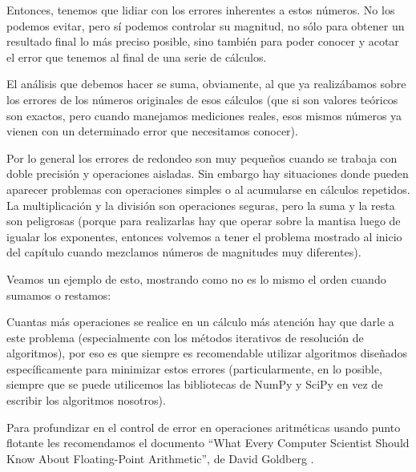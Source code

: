 Entonces, tenemos que lidiar con los errores inherentes a estos números. No los podemos evitar, pero sí podemos controlar su magnitud, no sólo para obtener un resultado final lo más preciso posible, sino también para poder conocer y acotar el error que tenemos al final de una serie de cálculos.

El análisis que debemos hacer se suma, obviamente, al que ya realizábamos sobre los errores de los números originales de esos cálculos (que si son valores teóricos son exactos, pero cuando manejamos mediciones reales, esos mismos números ya vienen con un determinado error que necesitamos conocer).

Por lo general los errores de redondeo son muy pequeños cuando se trabaja con doble precisión y operaciones aisladas. Sin embargo hay situaciones donde pueden aparecer problemas con operaciones simples o al acumularse en cálculos repetidos. La multiplicación y la división son operaciones seguras, pero la suma y la resta son peligrosas (porque para realizarlas hay que operar sobre la mantisa luego de igualar los exponentes, entonces volvemos a tener el problema mostrado al inicio del capítulo cuando mezclamos números de magnitudes muy diferentes).

Veamos un ejemplo de esto, mostrando como no es lo mismo el orden cuando sumamos o restamos:


Cuantas más operaciones se realice en un cálculo más atención hay que darle a este problema (especialmente con los métodos iterativos de resolución de algoritmos), por eso es que siempre es recomendable utilizar algoritmos diseñados específicamente para minimizar estos errores (particularmente, en lo posible, siempre que se puede utilicemos las bibliotecas de NumPy y SciPy en vez de escribir los algoritmos nosotros).

Para profundizar en el control de error en operaciones aritméticas usando punto flotante les recomendamos el documento ``What Every Computer Scientist Should Know About Floating-Point Arithmetic'', de David Goldberg \cite{compscientist-floatingpoint}.
